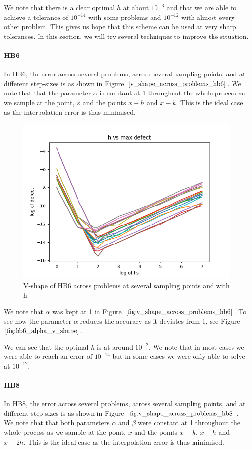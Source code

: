 \documentclass{article}
\begin{document}
We note that there is a clear optimal $h$ at about $10^{-3}$ and that we are able to achieve a tolerance of  $10^{-14}$ with some problems and $10^{-12}$ with almost every other problem. This gives us hope that this scheme can be used at very sharp tolerances. In this section, we will try several techniques to improve the situation. 


\paragraph{HB6}
In HB6, the error across several problems, across several sampling points, and at different step-sizes is as shown in Figure $\ref{v_shape_across_problems_hb6}$. We note that that the parameter $\alpha$ is constant at 1 throughout the whole process as we sample at the point, $x$ and the points $x+h$ and $x-h$. This is the ideal case as the interpolation error is thus minimised.

\begin{figure}[H]
\centering
\includegraphics[width=0.7\linewidth]{./figures/v_shape_across_problems_hb6}
\caption{V-shape of HB6 across problems at several sampling points and with h}
\label{fig:v_shape_across_problems_hb6}
\end{figure}

We note that $\alpha$ was kept at 1 in Figure $\ref{fig:v_shape_across_problems_hb6}$. To see how the parameter $\alpha$ reduces the accuracy as it deviates from 1, see Figure $\ref{fig:hb6_alpha_v_shape}$.

We can see that the optimal $h$ is at around $10^{-2}$. We note that in most cases we were able to reach an error of $10^{-14}$ but in some cases we were only able to solve at $10^{-12}$. 


\paragraph{HB8}
In HB8, the error across several problems, across several sampling points, and at different step-sizes is as shown in Figure $\ref{fig:v_shape_across_problems_hb8}$. We note that that both parameters $\alpha$ and $\beta$ were constant at 1 throughout the whole process as we sample at the point, $x$ and the points $x+h$, $x-h$ and $x-2h$. This is the ideal case as the interpolation error is thus minimised. 
\end{document}
